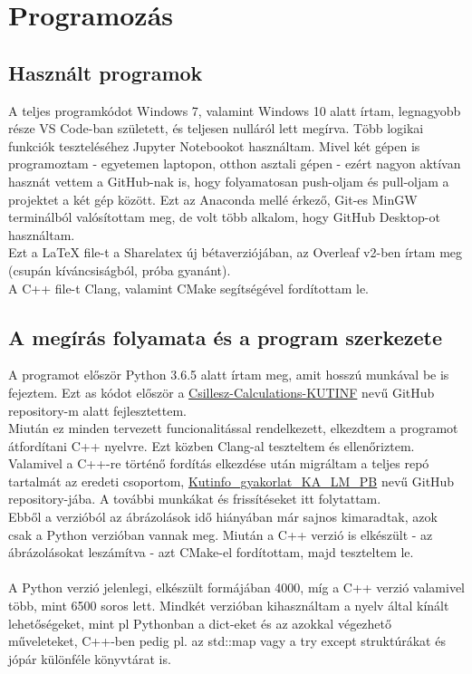 \chapter{Programozás}

\label{ch:programozas}

\section{Használt programok}

A teljes programkódot Windows 7, valamint Windows 10 alatt írtam, legnagyobb része VS Code-ban született, és teljesen nulláról lett megírva. Több logikai funkciók teszteléséhez Jupyter Notebookot használtam. Mivel két gépen is programoztam - egyetemen laptopon, otthon asztali gépen - ezért nagyon aktívan hasznát vettem a GitHub-nak is, hogy folyamatosan push-oljam és pull-oljam a projektet a két gép között. Ezt az Anaconda mellé érkező, Git-es MinGW terminálból valósítottam meg, de volt több alkalom, hogy GitHub Desktop-ot használtam.\\
Ezt a LaTeX file-t a Sharelatex új bétaverziójában, az Overleaf v2-ben írtam meg (csupán kíváncsiságból, próba gyanánt).\\
A C++ file-t Clang, valamint CMake segítségével fordítottam le.

\section{A megírás folyamata és a program szerkezete}

A programot először Python 3.6.5 alatt írtam meg, amit hosszú munkával be is fejeztem. Ezt as kódot először a \href{https://github.com/masterdesky/Csillesz-Calculations-KUTINF}{Csillesz-Calculations-KUTINF} nevű GitHub repository-m alatt fejlesztettem.\\
Miután ez minden tervezett funcionalitással rendelkezett, elkezdtem a programot átfordítani C++ nyelvre. Ezt közben Clang-al teszteltem és ellenőriztem. \\ 
Valamivel a C++-re történő fordítás elkezdése után migráltam a teljes repó tartalmát az eredeti csoportom, \href{https://github.com/masterdesky/Kutinfo_gyakorlat_KA_LM_PB}{Kutinfo\_gyakorlat\_KA\_LM\_PB} nevű GitHub repository-jába. A további munkákat és frissítéseket itt folytattam.\\
Ebből a verzióból az ábrázolások idő hiányában már sajnos kimaradtak, azok csak a Python verzióban vannak meg. Miután a C++ verzió is elkészült - az ábrázolásokat leszámítva - azt CMake-el fordítottam, majd teszteltem le.\\ \\
A Python verzió jelenlegi, elkészült formájában 4000, míg a C++ verzió valamivel több, mint 6500 soros lett. Mindkét verzióban kihasználtam a nyelv által kínált lehetőségeket, mint pl Pythonban a dict-eket és az azokkal végezhető műveleteket, C++-ben pedig pl. az std::map vagy a try{} except{} struktúrákat és jópár különféle könyvtárat is.


